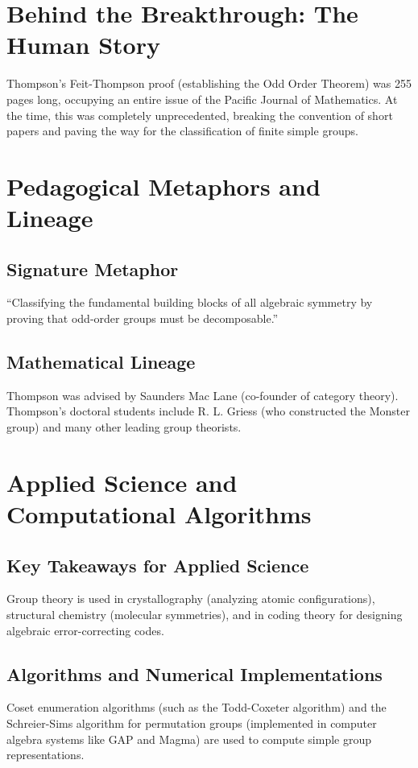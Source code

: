 \section{Behind the Breakthrough: The Human Story}
Thompson's Feit-Thompson proof (establishing the Odd Order Theorem) was 255 pages long, occupying an entire issue of the Pacific Journal of Mathematics. At the time, this was completely unprecedented, breaking the convention of short papers and paving the way for the classification of finite simple groups.

\section{Pedagogical Metaphors and Lineage}
\subsection{Signature Metaphor}
``Classifying the fundamental building blocks of all algebraic symmetry by proving that odd-order groups must be decomposable.''

\subsection{Mathematical Lineage}
Thompson was advised by Saunders Mac Lane (co-founder of category theory). Thompson's doctoral students include R. L. Griess (who constructed the Monster group) and many other leading group theorists.

\section{Applied Science and Computational Algorithms}
\subsection{Key Takeaways for Applied Science}
Group theory is used in crystallography (analyzing atomic configurations), structural chemistry (molecular symmetries), and in coding theory for designing algebraic error-correcting codes.

\subsection{Algorithms and Numerical Implementations}
Coset enumeration algorithms (such as the Todd-Coxeter algorithm) and the Schreier-Sims algorithm for permutation groups (implemented in computer algebra systems like GAP and Magma) are used to compute simple group representations.

